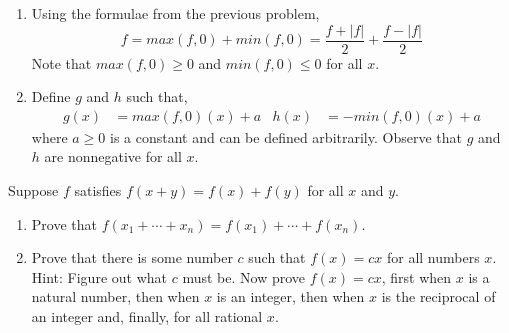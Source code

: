 \begin{solution}
  \begin{enumerate}[label = (\alph*)]
    \item Using the formulae from the previous problem,
    \begin{equation*}
      f = max(f,0) + min(f,0) = \frac{f + |f|}{2} + \frac{f - |f|}{2}
    \end{equation*}
    Note that $max(f,0) \geq 0$ and $min(f,0) \leq 0$ for all $x$.
    \item Define $g$ and $h$ such that,
    \begin{align*}
      g(x) &= max(f,0)(x) + a & h(x) &= -min(f,0)(x) + a
    \end{align*}
    where $a \geq 0$ is a constant and can be defined arbitrarily. Observe
    that $g$ and $h$ are nonnegative for all $x$.
  \end{enumerate}
\end{solution}

\begin{pr} \label{3.16}
  Suppose $f$ satisfies $f(x + y) = f(x) + f(y)$ for all $x$ and $y$.
  \begin{enumerate}[label = (\alph*)]
    \item Prove that $f(x_1 + \cdots + x_n) = f(x_1) + \cdots + f(x_n)$.
    \item Prove that there is some number $c$ such that $f(x) = cx$ for all
     numbers $x$. Hint: Figure out what $c$ must be.
    Now prove $f(x) = cx$, first when $x$ is a natural
    number, then when $x$ is an integer, then when $x$ is the reciprocal of an integer
    and, finally, for all rational $x$.
  \end{enumerate}
\end{pr}

